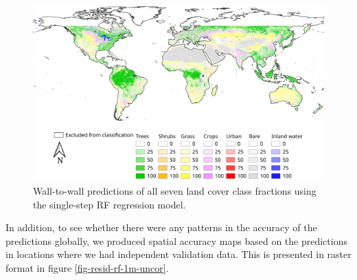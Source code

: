 \documentclass[a4paper,10pt]{article}
\begin{document}
\begin{figure}
    \centering
    \includegraphics[width=\textwidth]{article-figures/maps/2020-05-25-walltowall}
    \caption{Wall-to-wall predictions of all seven land cover class fractions using the single-step \gls{RF} regression model.}
    \label{fig-walltowall}
\end{figure}

In addition, to see whether there were any patterns in the accuracy of the predictions globally, we produced spatial accuracy maps based on the predictions in locations where we had independent validation data.
This is presented in raster format in figure \ref{fig-resid-rf-1m-uncor}.
\end{document}
